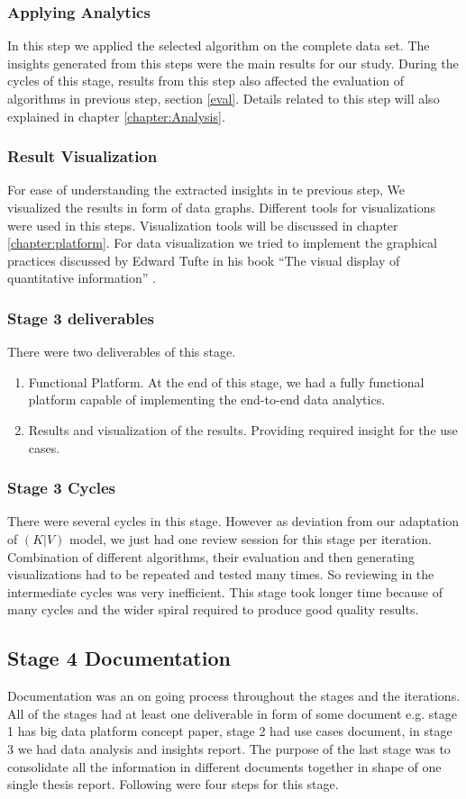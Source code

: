 \subsubsection{Applying Analytics}
In this step we applied the selected algorithm on the complete data set. The insights generated from this steps were the main results for our study. During the cycles of this stage, results from this step also affected the evaluation of algorithms in previous step, section \ref{eval}. Details related to this step will also explained in chapter \ref{chapter:Analysis}.    
\subsubsection{Result Visualization}
For ease of understanding the extracted insights in te previous step, We visualized the results in form of data graphs. Different tools for visualizations were used in this steps. Visualization tools will be discussed in chapter \ref{chapter:platform}. For data visualization we tried to implement the graphical practices discussed by Edward Tufte in his book ``The visual display of quantitative information'' \cite{tufte1983visual}.
\subsubsection{Stage 3 deliverables}
There were two deliverables of this stage.
\begin{enumerate}
\item Functional Platform. At the end of this stage, we had a fully functional platform capable of implementing the end-to-end data analytics.
\item Results and visualization of the results. Providing required insight for the use cases. 
\end{enumerate}
\subsubsection{Stage 3 Cycles}
There were several cycles in this stage. However as deviation from our adaptation of \((K|V)\) model, we just had one review session for this stage per iteration. Combination of different algorithms, their evaluation and then generating visualizations had to be repeated and tested many times. So reviewing in the intermediate cycles was very inefficient. This stage took longer time because of many cycles and the wider spiral required to produce good quality results.
\subsection{Stage 4 Documentation}
Documentation was an on going process throughout the stages and the iterations. All of the stages had at least one deliverable in form of some document e.g. stage 1 has big data platform concept paper, stage 2 had use cases document, in stage 3 we had data analysis and insights report. The purpose of the last stage was to consolidate all the information in different documents together in shape of one single thesis report. Following were four steps for this stage. 
